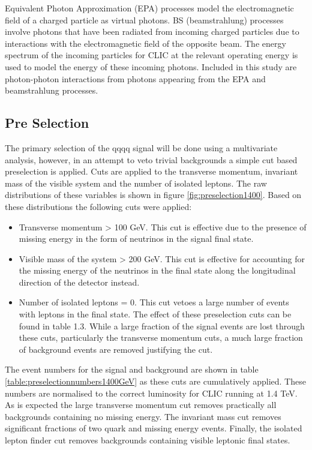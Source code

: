 Equivalent Photon Approximation (EPA) processes model the electromagnetic field of a charged particle as virtual photons.  BS (beamstrahlung) processes involve photons that have been radiated from incoming charged particles due to interactions with the electromagnetic field of the opposite beam.   The energy spectrum of the incoming particles for CLIC at the relevant operating energy is used to model the energy of these incoming photons.  Included in this study are photon-photon interactions from photons appearing from the EPA and beamstrahlung processes.

\subsection{Pre Selection}
\label{sec:preselection1400GeV}
The primary selection of the \nu{\nu}qqqq signal will be done using a multivariate analysis, however, in an attempt to veto trivial backgrounds a simple cut based preselection is applied. Cuts are applied to the transverse momentum, invariant mass of the visible system and the number of isolated leptons. The raw distributions of these variables is
shown in figure \ref{fig:preselection1400}. Based on these distributions the following cuts were applied:

\begin{itemize}
\item Transverse momentum > 100 GeV. This cut is effective due to the presence of missing energy in the form of neutrinos in the signal final state.
\item Visible mass of the system > 200 GeV. This cut is effective for accounting for the missing energy of the neutrinos in the final state along the longitudinal direction of the detector instead.
\item Number of isolated leptons = 0. This cut vetoes a large number of events with leptons in the final state.
The effect of these preselection cuts can be found in table 1.3. While a large fraction of the signal events are lost through these cuts, particularly the transverse momentum cuts, a much large fraction of background events are removed justifying the cut.
\end{itemize}

The event numbers for the signal and background are shown in table \ref{table:preselectionnumbers1400GeV} as these cuts are cumulatively applied.  These numbers are normalised to the correct luminosity for CLIC running at 1.4 TeV.  As is expected the large transverse momentum cut removes practically all backgrounds containing no missing energy.  The invariant mass cut removes significant fractions of two quark and missing energy events.  Finally, the isolated lepton finder cut removes backgrounds containing visible leptonic final states.  

